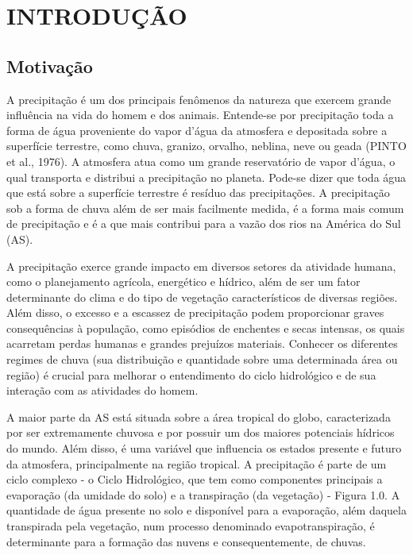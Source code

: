 \hypertarget{estilo:capitulo}{}
\chapter{INTRODUÇÃO} 

\section{Motivação}
\label{ss:motivacao}

A precipitação é um dos principais fenômenos da natureza que exercem grande influência na vida do homem e dos animais. Entende-se por precipitação toda a forma de água proveniente do vapor d'água da atmosfera e depositada sobre a superfície terrestre, como chuva, granizo, orvalho, neblina, neve ou geada (PINTO et al., 1976). A atmosfera atua como um grande reservatório de vapor d'água, o qual transporta e distribui a precipitação no planeta. Pode-se dizer que toda água que está sobre a superfície terrestre é resíduo das precipitações. A precipitação sob a forma de chuva além de ser mais facilmente medida, é a forma mais comum de precipitação e é a que mais contribui para a vazão dos rios na América do Sul (AS). 

A precipitação exerce grande impacto em diversos setores da atividade humana, como o planejamento agrícola, energético e hídrico, além de ser um fator determinante do clima e do tipo de vegetação característicos de diversas regiões. Além disso, o excesso e a escassez de precipitação podem proporcionar graves consequências à população, como episódios de enchentes e secas intensas, os quais acarretam perdas humanas e grandes prejuízos materiais. Conhecer os diferentes regimes de chuva (sua distribuição e quantidade sobre uma determinada área ou região) é crucial para melhorar o entendimento do ciclo hidrológico e de sua interação com as atividades do homem.

A maior parte da AS está situada sobre a área tropical do globo, caracterizada por ser extremamente chuvosa e por possuir um dos maiores potenciais hídricos do mundo. Além disso, é uma variável que influencia os estados presente e futuro da atmosfera, principalmente na região tropical. A precipitação é parte de um ciclo complexo - o Ciclo Hidrológico, que tem como componentes principais a evaporação (da umidade do solo) e a transpiração (da vegetação) - Figura 1.0. A quantidade de água presente no solo e disponível para a evaporação, além daquela transpirada pela vegetação, num processo denominado evapotranspiração, é determinante para a formação das nuvens e consequentemente, de chuvas.

